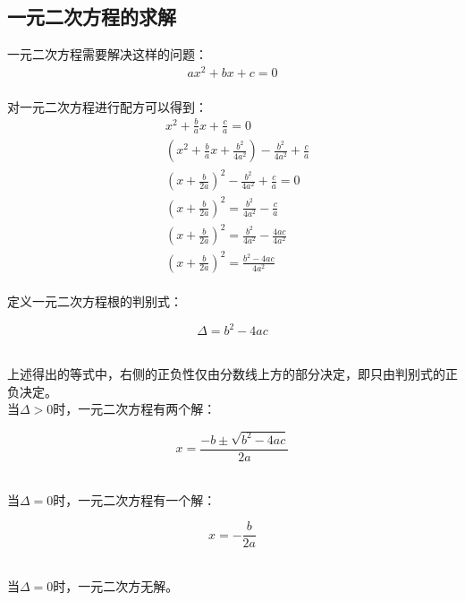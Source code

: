 \documentclass[UTF8]{ctexart}
\begin{document}
\subsection{一元二次方程的求解}
    一元二次方程需要解决这样的问题：
    \setcounter{equation}{0}
    \begin{align}
        ax^2+bx+c=0
    \end{align}\\
    对一元二次方程进行配方可以得到：
    \begin{align}
        &x^2+\frac{b}{a}x+\frac{c}{a}=0\\[3mm]
        &\left(x^2+\frac{b}{a}x+\frac{b^2}{4a^2}\right)-\frac{b^2}{4a^2}+\frac{c}{a}\\[3mm]
        &\left(x+\frac{b}{2a}\right)^2-\frac{b^2}{4a^2}+\frac{c}{a}=0\\[3mm]
        &\left(x+\frac{b}{2a}\right)^2=\frac{b^2}{4a^2}-\frac{c}{a}\\[3mm]
        &\left(x+\frac{b}{2a}\right)^2=\frac{b^2}{4a^2}-\frac{4ac}{4a^2}\\[3mm]
        &\left(x+\frac{b}{2a}\right)^2=\frac{b^2-4ac}{4a^2}
    \end{align}\\
    定义一元二次方程根的判别式：
    \begin{large}
        \begin{equation*}
            \Delta=b^2-4ac
        \end{equation*}
    \end{large}\\
    上述得出的等式中，右侧的正负性仅由分数线上方的部分决定，即只由判别式的正负决定。\\[10mm]
    当$\Delta>0$时，一元二次方程有两个解：
    \begin{large}
        \begin{equation*}
            x=\frac{-b\pm\sqrt{b^2-4ac}}{2a}
        \end{equation*}
    \end{large}\\
    当$\Delta=0$时，一元二次方程有一个解：
    \begin{large}
        \begin{equation*}
            x=-\frac{b}{2a}
        \end{equation*}
    \end{large}\\
    当$\Delta=0$时，一元二次方无解。

\newpage
\end{document}
